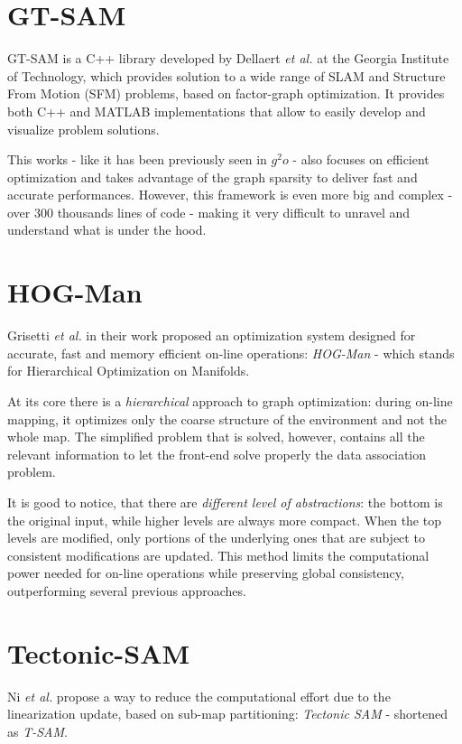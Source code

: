 \section{GT-SAM}\label{sec:gtsam}
GT-SAM is a C++ library developed by Dellaert \textit{et al.} \cite{dellaert2012gtsam} at the Georgia Institute of Technology, which provides solution to a wide range of SLAM and Structure From Motion (SFM) problems, based on factor-graph optimization. It provides both C++ and MATLAB implementations that allow to easily develop and visualize problem solutions. 

This works - like it has been previously seen in $g^2o$ - also focuses on efficient optimization and takes advantage of the graph sparsity to deliver fast and accurate performances. However, this framework is even more big and complex - over 300 thousands lines of code - making it very difficult to unravel and understand what is under the hood.

\section{HOG-Man}\label{sec:hogman}
Grisetti \textit{et al.} in their work \cite{grisetti2010hogman} proposed an optimization system designed for accurate, fast and memory efficient on-line operations: \textit{HOG-Man} - which stands for Hierarchical Optimization on Manifolds.

At its core there is a \textit{hierarchical} approach to graph optimization: during on-line mapping, it optimizes only the coarse structure of the environment and not the whole map. The simplified problem that is solved, however, contains all the relevant information to let the front-end solve properly the data association problem. 

It is good to notice, that there are \textit{different level of abstractions}: the bottom is the original input, while higher levels are always more compact. When the top levels are modified, only portions of the underlying ones that are subject to consistent modifications are updated. This method limits the computational power needed for on-line operations while preserving global consistency, outperforming several previous approaches.

\section{Tectonic-SAM}\label{sec:tsam}
Ni \textit{et al.} propose a way to reduce the computational effort due to the linearization update, based on sub-map partitioning: \textit{Tectonic SAM} \cite{ni2007tectonic} - shortened as \textit{T-SAM}.

